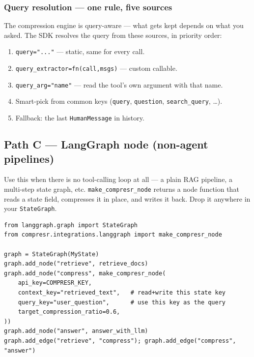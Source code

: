 \documentclass[10pt,a4paper]{article}
\begin{document}
\subsubsection*{Query resolution --- one rule, five sources}

The compression engine is query-aware --- what gets kept depends on what you asked. The SDK resolves the query from these sources, in priority order:
\begin{enumerate}[leftmargin=*,itemsep=1pt]
  \item \texttt{query="..."} --- static, same for every call.
  \item \texttt{query\_extractor=fn(call,msgs)} --- custom callable.
  \item \texttt{query\_arg="name"} --- read the tool's own argument with that name.
  \item Smart-pick from common keys (\texttt{query}, \texttt{question}, \texttt{search\_query}, \ldots).
  \item Fallback: the last \texttt{HumanMessage} in history.
\end{enumerate}

\subsection{Path C --- LangGraph node (non-agent pipelines)}

Use this when there is no tool-calling loop at all --- a plain RAG pipeline, a multi-step state graph, etc. \texttt{make\_compresr\_node} returns a node function that reads a state field, compresses it in place, and writes it back. Drop it anywhere in your \texttt{StateGraph}.

\begin{lstlisting}
from langgraph.graph import StateGraph
from compresr.integrations.langgraph import make_compresr_node

graph = StateGraph(MyState)
graph.add_node("retrieve", retrieve_docs)
graph.add_node("compress", make_compresr_node(
    api_key=COMPRESR_KEY,
    context_key="retrieved_text",   # read+write this state key
    query_key="user_question",      # use this key as the query
    target_compression_ratio=0.6,
))
graph.add_node("answer", answer_with_llm)
graph.add_edge("retrieve", "compress"); graph.add_edge("compress", "answer")
\end{lstlisting}
\end{document}
